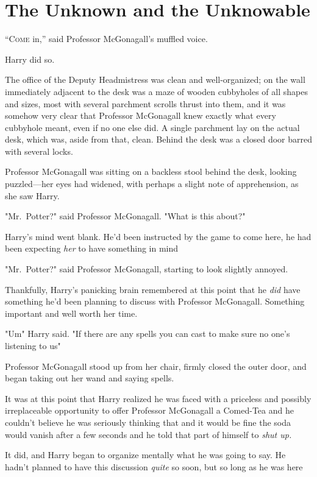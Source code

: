 \chapter{The Unknown and the Unknowable}

\lettrine{“C}{ome} in,'' said Professor McGonagall's muffled voice.

\qquad\quad
Harry did so.

The office of the Deputy Headmistress was clean and well-organized; on the wall
immediately adjacent to the desk was a maze of wooden cubbyholes of all shapes
and sizes, most with several parchment scrolls thrust into them, and it was
somehow very clear that Professor McGonagall knew exactly what every cubbyhole
meant, even if no one else did. A single parchment lay on the actual desk,
which was, aside from that, clean. Behind the desk was a closed door barred
with several locks.

Professor McGonagall was sitting on a backless stool behind the desk, looking
puzzled—her eyes had widened, with perhaps a slight note of apprehension, as
she saw Harry.

"Mr.~Potter?" said Professor McGonagall. "What is this about?"

Harry's mind went blank. He'd been instructed by the game to come here, he had
been expecting \emph{her} to have something in mind{\el}

"Mr.~Potter?" said Professor McGonagall, starting to look slightly annoyed.

Thankfully, Harry's panicking brain remembered at this point that he \emph{did}
have something he'd been planning to discuss with Professor McGonagall.
Something important and well worth her time.

"Um{\el}" Harry said. "If there are any spells you can cast to make sure no
one's listening to us{\el}"

Professor McGonagall stood up from her chair, firmly closed the outer door, and
began taking out her wand and saying spells.

It was at this point that Harry realized he was faced with a priceless and
possibly irreplaceable opportunity to offer Professor McGonagall a Comed-Tea
and he couldn't believe he was seriously thinking that and it would be fine the
soda would vanish after a few seconds and he told that part of himself to
\emph{shut up.}

It did, and Harry began to organize mentally what he was going to say. He
hadn't planned to have this discussion \emph{quite} so soon, but so long as he
was here{\el}

